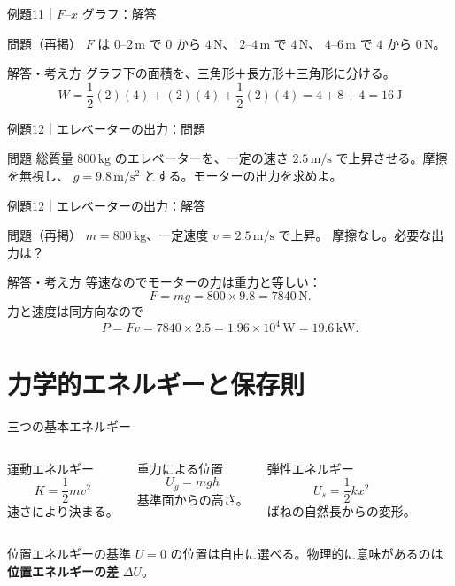 \documentclass[notheorems,aspectratio=169]{beamer}
\newcommand{\key}[1]{\textbf{\color{ChinaRed}#1}}
\newcommand{\qcard}[1]{%
  \begin{block}{問題}\centering\large #1\end{block}}
\newcommand{\qsmall}[1]{%
  \begin{block}{問題（再掲）}\small #1\end{block}}
\newcommand{\acard}[1]{%
  \begin{exampleblock}{解答・考え方}#1\end{exampleblock}}
\begin{document}
\begin{frame}{例題11｜$F$--$x$ グラフ：解答}
  \qsmall{
    $F$ は $0$--$2\,\mathrm m$ で $0$ から $4\,\mathrm N$、
    $2$--$4\,\mathrm m$ で $4\,\mathrm N$、
    $4$--$6\,\mathrm m$ で $4$ から $0\,\mathrm N$。
  }
  \acard{
    グラフ下の面積を、三角形＋長方形＋三角形に分ける。
    \[
      W=
      \frac12(2)(4)+(2)(4)+\frac12(2)(4)
      =4+8+4
      =\boxed{16\,\mathrm J}
    \]
  }
\end{frame}

\begin{frame}{例題12｜エレベーターの出力：問題}
  \vfill
  \qcard{
    総質量 $800\,\mathrm{kg}$ のエレベーターを、一定の速さ
    $2.5\,\mathrm{m/s}$ で上昇させる。摩擦を無視し、
    $g=9.8\,\mathrm{m/s^2}$ とする。モーターの出力を求めよ。
  }
  \vfill
\end{frame}

\begin{frame}{例題12｜エレベーターの出力：解答}
  \qsmall{
    $m=800\,\mathrm{kg}$、一定速度 $v=2.5\,\mathrm{m/s}$ で上昇。
    摩擦なし。必要な出力は？
  }
  \acard{
    等速なのでモーターの力は重力と等しい：
    \[
      F=mg=800\times9.8=7840\,\mathrm N.
    \]
    力と速度は同方向なので
    \[
      P=Fv=7840\times2.5
      =1.96\times10^4\,\mathrm W
      =\boxed{19.6\,\mathrm{kW}}.
    \]
  }
\end{frame}

\section{力学的エネルギーと保存則}

\begin{frame}{三つの基本エネルギー}
  \begin{columns}[T,onlytextwidth]
    \begin{block}{運動エネルギー}
      \[
        \boxed{K=\frac12mv^2}
      \]
      速さにより決まる。
    \end{block}
    \begin{block}{重力による位置}
      \[
        \boxed{U_g=mgh}
      \]
      基準面からの高さ。
    \end{block}
    \begin{block}{弾性エネルギー}
      \[
        \boxed{U_s=\frac12kx^2}
      \]
      ばねの自然長からの変形。
    \end{block}
  \end{columns}

  \vfill
  \begin{alertblock}{位置エネルギーの基準}
    $U=0$ の位置は自由に選べる。物理的に意味があるのは
    \key{位置エネルギーの差} $\Delta U$。
  \end{alertblock}
\end{frame}
\end{document}
